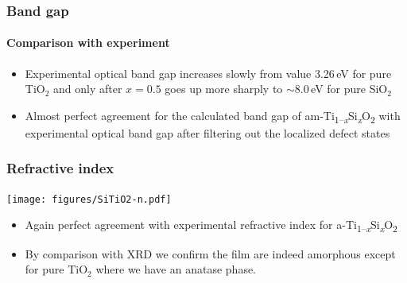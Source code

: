 \documentclass[noamsthm,8pt,t]{beamer}
\def\TiSiO{Ti\textsubscript{1--\itshape x}Si\textsubscript{\itshape x}O\textsubscript{2}}
\begin{document}
\begin{frame}
   \frametitle{Band gap}
   \framesubtitle{Comparison with experiment}

   \begin{center}
   \end{center}

   \begin{itemize}
      \item Experimental optical band gap increases slowly from value 3.26\,eV for pure TiO$_2$ and only after $x = 0.5$ goes up more sharply to $\sim$8.0\,eV for pure SiO$_2$
      \item<2> Almost perfect agreement for the calculated band gap of am-\TiSiO{} with experimental optical band gap after filtering out the localized defect states
   \end{itemize}
\end{frame}

\begin{frame}
\frametitle{Refractive index}
   \vspace{-0.3cm}
   \begin{center}
      \texttt{[image: figures/SiTiO2-n.pdf]}
   \end{center}

   \begin{itemize}
      \item Again perfect agreement with experimental refractive index for a-\TiSiO{}
      \item<2> By comparison with XRD we confirm the film are indeed amorphous except for pure TiO$_2$ where we have an anatase phase.
   \end{itemize}

   \begin{center}
   \end{center}

\end{frame}
\end{document}
